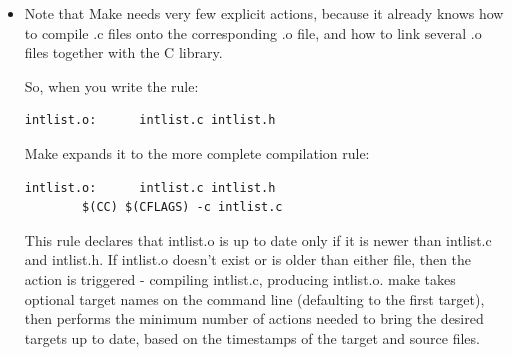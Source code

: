 \documentclass[handout]{beamer}
\begin{document}
\begin{frame}[fragile]

\begin{itemize}
      \item
	Note that Make needs very few explicit actions,
	because it already knows how to compile \alert{.c} files onto the corresponding \alert{.o} file, and how to link several \alert{.o} files together with the C library.

      \pitem
      So, when you write the rule:
\begin{verbatim}
intlist.o:      intlist.c intlist.h
\end{verbatim}

      \pause
      Make expands it to the more complete compilation rule:

\begin{verbatim}
intlist.o:      intlist.c intlist.h
        $(CC) $(CFLAGS) -c intlist.c
\end{verbatim}

      \pitem
	This rule declares that \alert{intlist.o} is up
	to date only if it is \alert{newer than intlist.c and intlist.h}.
	If \alert{intlist.o doesn't exist} or \alert{is older than either file},
	then the action is triggered - compiling \alert{intlist.c}, producing \alert{intlist.o}.
      \pitem
        \alert{make} takes optional target names on the command line
	(defaulting to the first target),
        then performs the \alert{minimum number of actions}
	needed to bring the desired targets \alert{up to date},
	based on the \alert{timestamps} of the target and source files.
	
%

\end{itemize}

\end{frame}
\end{document}
